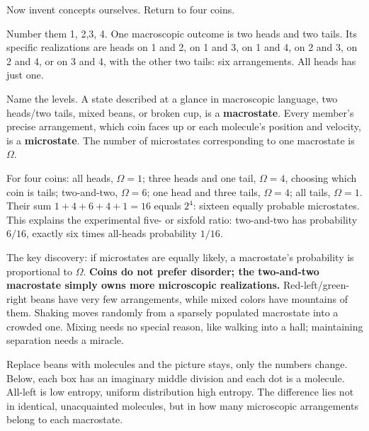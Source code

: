 
Now invent concepts ourselves. Return to four coins.

Number them 1, 2,3, 4. One macroscopic outcome is two heads and two tails. Its specific realizations are heads on 1 and 2, on 1 and 3, on 1 and 4, on 2 and 3, on 2 and 4, or on 3 and 4, with the other two tails: six arrangements. All heads has just one.

\begin{mainline}
Name the levels. A state described at a glance in macroscopic language, two heads/two tails, mixed beans, or broken cup, is a \textbf{macrostate}. Every member's precise arrangement, which coin faces up or each molecule's position and velocity, is a \textbf{microstate}. The number of microstates corresponding to one macrostate is \(\Omega\).
\end{mainline}

For four coins: all heads, \(\Omega=1\); three heads and one tail, \(\Omega=4\), choosing which coin is tails; two-and-two, \(\Omega=6\); one head and three tails, \(\Omega=4\); all tails, \(\Omega=1\). Their sum \(1+4+6+4+1=16\) equals \(2^4\): sixteen equally probable microstates. This explains the experimental five- or sixfold ratio: two-and-two has probability \(6/16\), exactly six times all-heads probability \(1/16\).

The key discovery: if microstates are equally likely, a macrostate's probability is proportional to \(\Omega\). \textbf{Coins do not prefer disorder; the two-and-two macrostate simply owns more microscopic realizations.} Red-left/green-right beans have very few arrangements, while mixed colors have mountains of them. Shaking moves randomly from a sparsely populated macrostate into a crowded one. Mixing needs no special reason, like walking into a hall; maintaining separation needs a miracle.

Replace beans with molecules and the picture stays, only the numbers change. Below, each box has an imaginary middle division and each dot is a molecule. All-left is low entropy, uniform distribution high entropy. The difference lies not in identical, unacquainted molecules, but in how many microscopic arrangements belong to each macrostate.

\begin{center}
\end{center}

